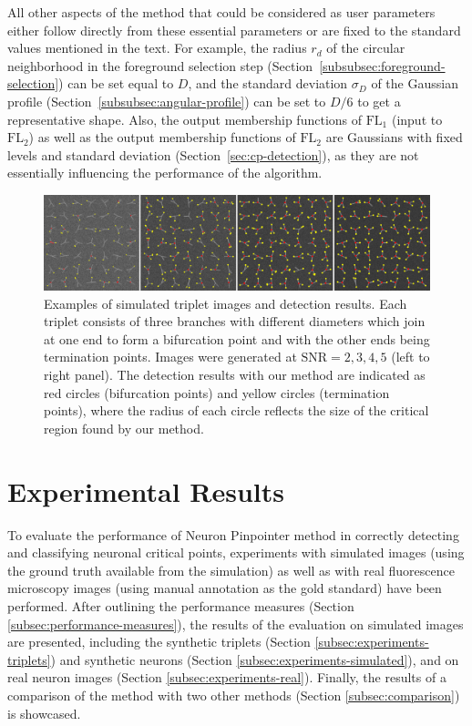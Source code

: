 All other aspects of the method that could be considered as user parameters either follow directly from these essential parameters or are fixed to the standard values mentioned in the text. For example, the radius $r_d$ of the circular neighborhood in the foreground selection step (Section~\ref{subsubsec:foreground-selection}) can be set equal to $D$, and the standard deviation $\sigma_{\!D}$ of the Gaussian profile (Section~\ref{subsubsec:angular-profile}) can be set to $D/6$ to get a representative shape. Also, the output membership functions of $\textrm{FL}_1$ (input to $\textrm{FL}_2$) as well as the output membership functions of $\textrm{FL}_2$ are Gaussians with fixed levels and standard deviation (Section~\ref{sec:cp-detection}), as they are not essentially influencing the performance of the algorithm.

\begin{figure}[t!]
	\centering
	\includegraphics[width=\columnwidth]{triplets-snr-2345}
	\caption{Examples of simulated triplet images and detection results. Each triplet consists of three branches with different diameters which join at one end to form a bifurcation point and with the other ends being termination points. Images were generated at $\textrm{SNR}=2,3,4,5$ (left to right panel). The detection results with our method are indicated as red circles (bifurcation points) and yellow circles (termination points), where the radius of each circle reflects the size of the critical region found by our method.}
	\label{fig:tiplet-images}
\end{figure}

\section{Experimental Results}
\label{sec:experiments}
To evaluate the performance of Neuron Pinpointer method in correctly detecting and classifying neuronal critical points, experiments with simulated images (using the ground truth available from the simulation) as well as with real fluorescence microscopy images (using manual annotation as the gold standard) have been performed. After outlining the performance measures (Section \ref{subsec:performance-measures}), the results of the evaluation on simulated images are presented, including the synthetic triplets (Section \ref{subsec:experiments-triplets}) and synthetic neurons (Section \ref{subsec:experiments-simulated}), and on real neuron images (Section \ref{subsec:experiments-real}). Finally, the results of a comparison of the method with two other methods (Section \ref{subsec:comparison}) is showcased.

